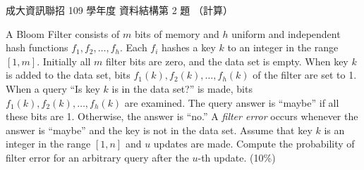 \begin{pastexam}[label={px:ncku-109-prog-02}]{成大資訊聯招 109 學年度 資料結構第 2 題}
（計算）

A Bloom Filter consists of $m$ bits of memory and $h$ uniform and independent hash functions
$f_1, f_2, \ldots, f_h$. Each $f_i$ hashes a key $k$ to an integer in the range $[1, m]$.
Initially all $m$ filter bits are zero, and the data set is empty. When key $k$ is added to the
data set, bits $f_1(k), f_2(k), \ldots, f_h(k)$ of the filter are set to 1. When a query ``Is
key $k$ is in the data set?'' is made, bits $f_1(k), f_2(k), \ldots, f_h(k)$ are examined. The
query answer is ``maybe'' if all these bits are 1. Otherwise, the answer is ``no.'' A
\textit{filter error} occurs whenever the answer is ``maybe'' and the key is not in the data set.
Assume that key $k$ is an integer in the range $[1, n]$ and $u$ updates are made. Compute the
probability of filter error for an arbitrary query after the $u$-th update. \quad (10\%)
\end{pastexam}

